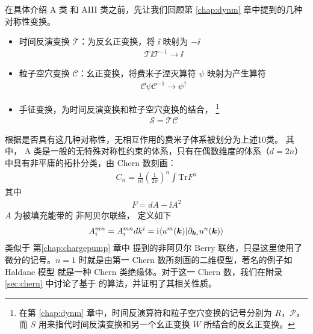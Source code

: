 在具体介绍 A 类 和 AIII 类之前，先让我们回顾第 \ref{chap:dynm} 章中提到的几种对称性变换。
\begin{itemize}
    \item 时间反演变换 $\mathcal{T}$：为反幺正变换，将 $\ii$ 映射为 $-\ii$
    \begin{align}
    \mathcal{T} \ii \mathcal{T}^{-1} \rightarrow \ii
    \end{align}

    \item 粒子空穴变换 $\mathcal{C}$：幺正变换，将费米子湮灭算符 $\psi$ 映射为产生算符 
    \begin{align}
        \mathcal{C}\psi\mathcal{C}^{-1} \rightarrow \psi^{\dag}
    \end{align}

    \item 手征变换，为时间反演变换和粒子空穴变换的结合，
    \footnote{在第 \ref{chap:dynm} 章中，时间反演算符和粒子空穴变换的记号分别为 $R$，$\mathcal{P}$，而 $S$ 用来指代时间反演变换和另一个幺正变换 $W$ 所结合的反幺正变换。}
    \begin{align}
        \mathcal{S} = \mathcal{T} \mathcal{C}
    \end{align}

\end{itemize}
根据是否具有这几种对称性，无相互作用的费米子体系被划分为上述10类。
其中，
A 类是一般的无特殊对称性约束的体系，只有在偶数维度的体系（$d=2n$）中具有非平庸的拓扑分类，由 Chern 数刻画：
\begin{align}
C_n = \frac{1}{n!}\left(\frac{1}{2\pi}\right)^{n}\int\text{Tr} F^n
\end{align}
其中 
\begin{align}
F = dA - \ii A^2
\end{align}
$A$ 为被填充能带的 非阿贝尔联络，
定义如下
\begin{align}
A_i^{mn} = A_i^{mn}dk^i = \mathrm{i} \langle u^m(\boldsymbol{k})|\partial_{\boldsymbol{k}_i} u^n(\boldsymbol{k})\rangle
\end{align}
类似于 第\ref{chap:chargepump} 章中 提到的非阿贝尔 Berry 联络，只是这里使用了微分的记号。$n=1$ 时就是由第一 Chern 数所刻画的二维模型，著名的例子如 Haldane 模型\cite{haldane1988} 就是一种 Chern 类绝缘体。对于这一 Chern 数，我们在附录 \ref{sec:chern} 中讨论了基于  的算法，并证明了其相关性质。


